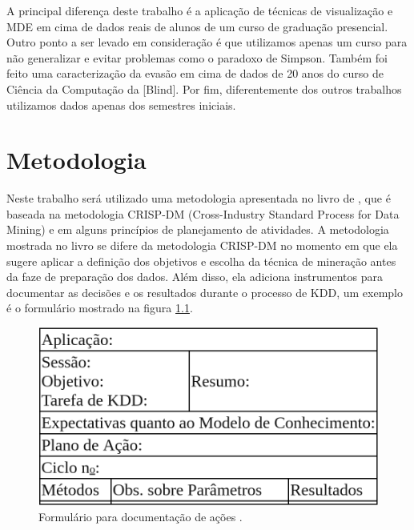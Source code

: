 \documentclass[diss,capa]{texufpel}
\begin{document}
    
    A principal diferença deste trabalho é a aplicação de técnicas de visualização e MDE em cima de dados reais de alunos de um curso de graduação presencial.
    Outro ponto a ser levado em consideração é que utilizamos apenas um curso para não generalizar e evitar problemas como o paradoxo de Simpson.
    Também foi feito uma caracterização da evasão em cima de dados de 20 anos do curso de Ciência da Computação da [Blind].
    Por fim, diferentemente dos outros trabalhos utilizamos dados apenas dos semestres iniciais.

\chapter{Metodologia}

    Neste trabalho será utilizado uma metodologia apresentada no livro de \citet{goldschmidt2015data}, que é baseada na metodologia CRISP-DM (Cross-Industry Standard Process for Data Mining) e em alguns princípios de planejamento de atividades. A metodologia mostrada no livro se difere da metodologia CRISP-DM no momento em que ela sugere aplicar a definição dos objetivos e escolha da técnica de mineração antes da faze de preparação dos dados. Além disso, ela adiciona instrumentos para documentar as decisões e os resultados durante o processo de KDD, um exemplo é o formulário mostrado na figura \ref{fig:formulario-para-documentacao-de-acoes}.
    
    \begin{figure}[htbp]
      \centering \includegraphics[scale=.4]{imagens/formulario-para-documentacao-de-acoes.png}
      \caption{Formulário para documentação de ações \cite{goldschmidt2015data}.}
      \label{fig:formulario-para-documentacao-de-acoes}
    \end{figure}
    
\end{document}
